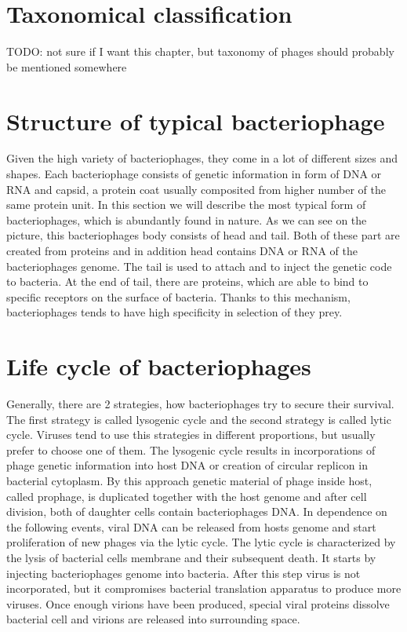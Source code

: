 \section{Taxonomical classification}
TODO: not sure if I want this chapter, but taxonomy of phages should probably be mentioned somewhere

\section{Structure of typical bacteriophage}
Given the high variety of bacteriophages, they come in a lot of different sizes and shapes.
Each bacteriophage consists of genetic information in form of DNA or RNA and capsid, a protein coat usually composited from higher number of the same protein unit.
In this section we will describe the most typical form of bacteriophages, which is abundantly found in nature.
As we can see on the picture, this bacteriophages body consists of head and tail.
Both of these part are created from proteins and in addition head contains DNA or RNA of the bacteriophages genome.
The tail is used to attach and to inject the genetic code to bacteria.
At the end of tail, there are proteins, which are able to bind to specific receptors on the surface of bacteria.
Thanks to this mechanism, bacteriophages tends to have high specificity in selection of they prey.

\section{Life cycle of bacteriophages}
Generally, there are 2 strategies, how bacteriophages try to secure their survival.
The first strategy is called lysogenic cycle and the second strategy is called lytic cycle.
Viruses tend to use this strategies in different proportions, but usually prefer to choose one of them.
The lysogenic cycle results in incorporations of phage genetic information into host DNA or creation of circular replicon in bacterial cytoplasm.
By this approach genetic material of phage inside host, called prophage, is duplicated together with the host genome and after cell division, both of daughter cells contain bacteriophages DNA.
In dependence on the following events, viral DNA can be released from hosts genome and start proliferation of new phages via the lytic cycle.
The lytic cycle is characterized by the lysis of bacterial cells membrane and their subsequent death.
It starts by injecting bacteriophages genome into bacteria.
After this step virus is not incorporated, but it compromises bacterial translation apparatus to produce more viruses.
Once enough virions have been produced, special viral proteins dissolve bacterial cell and virions are released into surrounding space.

